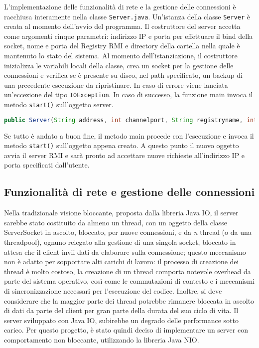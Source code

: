 \documentclass{article}
\begin{document}
L'implementazione delle funzionalità di rete e la gestione delle connessioni è racchiusa interamente nella classe \texttt{Server.java}. Un'istanza della classe \texttt{Server} è creata al momento dell'avvio del programma. Il costruttore del server accetta come argomenti cinque parametri: indirizzo IP e porta per effettuare il bind della socket, nome e porta del Registry RMI e directory della cartella nella quale è mantenuto lo stato del sistema. Al momento dell'istanziazione, il costruttore inizializza le variabili locali della classe, crea un socket per la gestione delle connessioni e verifica se è presente su disco, nel path specificato, un backup di una precedente esecuzione da ripristinare. In caso di errore viene lanciata un'eccezione del tipo \texttt{IOException}. In caso di successo, la funzione main invoca il metodo \texttt{start()} sull'oggetto server.\newline
\begin{lstlisting}[language=Java, caption=Firma del metodo costruttore della classe \texttt{Server.java}]
public Server(String address, int channelport, String registryname, int rmiport, String workingdir)
\end{lstlisting}
Se tutto è andato a buon fine, il metodo main procede con l'esecuzione e invoca il metodo \texttt{start()} sull'oggetto appena creato. A questo punto il nuovo oggetto avvia il server RMI e sarà pronto ad accettare nuove richieste all'indirizzo IP e porta specificati dall'utente.

\subsection{Funzionalità di rete e gestione delle connessioni}

Nella tradizionale visione bloccante, proposta dalla libreria Java IO, il server sarebbe stato costituito da almeno un thread, con un oggetto della classe ServerSocket in ascolto, bloccato, per nuove connessioni, e da \emph n thread (o da una threadpool), ognuno relegato alla gestione di una singola socket, bloccato in attesa che il client invii dati da elaborare sulla connessione; questo meccanismo non è adatto per sopportare alti carichi di lavoro: il processo di creazione dei thread è molto costoso, la creazione di un thread comporta notevole overhead da parte del sistema operativo, così come le commutazioni di contesto e i meccanismi di sincronizzazione necessari per l'esecuzione del codice. Inoltre, si deve considerare che la maggior parte dei thread potrebbe rimanere bloccata in ascolto di dati da parte del client per gran parte della durata del suo ciclo di vita. Il server sviluppato con Java IO, subirebbe un degrado delle performance sotto carico.
Per questo progetto, è stato quindi deciso di implementare un server con comportamento non bloccante, utilizzando la libreria Java NIO.
\newline
\end{document}
